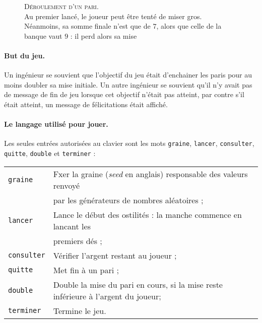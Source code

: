 \documentclass{article}
\begin{document}
\begin{figure}[h]
	\caption	{	\textsc{Déroulement d'un pari.}
						\\
						Au premier lancé, le joueur peut être tenté de miser gros.
						\\
						Néanmoins, sa somme finale n'est que de $7$, alors que celle de la banque vaut $9$ :
						il perd alors sa mise
					}
		\label{exemple}
\end{figure}

\paragraph{But du jeu.} Un ingénieur se souvient que l'objectif du jeu était d'enchainer les paris pour
au moins doubler sa mise initiale. Un autre ingénieur se souvient qu'il n'y avait pas de message de fin de jeu
lorsque cet objectif n'était pas atteint, par contre s'il était atteint, un message de félicitations était affiché.

\paragraph{Le langage utilisé pour jouer.} Les seules entrées autorisées au clavier sont les mots
{\tt graine}, {\tt lancer}, {\tt consulter}, {\tt quitte}, {\tt double} et {\tt terminer} :
\begin{center}
	\begin{tabular}{ll}
		{\tt graine}			&	Fxer la graine (\emph{seed} en anglais) responsable des valeurs renvoyé
		\\
								&	par les générateurs de nombres aléatoires ;
		\\
		{\tt lancer}		&	Lance le début des ostilités : la manche commence en lancant les
		\\
								&	premiers dés ;
		\\
		{\tt consulter}	&	Vérifier l'argent restant au joueur ;	
		\\
		{\tt quitte}			&	Met fin à un pari ;
		\\
		{\tt double}		&	Double la mise du pari en cours, si la mise reste inférieure à l'argent du joueur;
		\\
		{\tt terminer}		&	Termine le jeu.
	\end{tabular}
\end{center}
\end{document}
